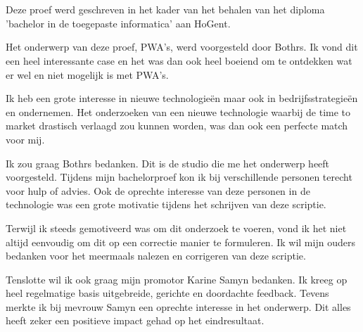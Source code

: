 
\chapter*{}
\label{ch:voorwoord}


Deze proef werd geschreven in het kader van het behalen van het diploma 'bachelor in de toegepaste informatica' aan HoGent.

Het onderwerp van deze proef, PWA's, werd voorgesteld door Bothrs. Ik vond dit een heel interessante case en het was dan ook heel boeiend om te ontdekken wat er wel en niet mogelijk is met PWA's.

Ik heb een grote interesse in nieuwe technologieën maar ook in bedrijfsstrategieën en ondernemen. Het onderzoeken van een nieuwe technologie waarbij de time to market drastisch verlaagd zou kunnen worden, was dan ook een perfecte match voor mij. 

Ik zou graag Bothrs bedanken. Dit is de studio die me het onderwerp heeft voorgesteld. 
Tijdens mijn bachelorproef kon ik bij verschillende personen terecht voor hulp of advies. Ook de oprechte interesse van deze personen in de technologie was een grote motivatie tijdens het schrijven van deze scriptie.

Terwijl ik steeds gemotiveerd was om dit onderzoek te voeren, vond ik het niet altijd eenvoudig om dit op een correctie manier te formuleren. Ik wil mijn ouders bedanken voor het meermaals nalezen en corrigeren van deze scriptie.

Tenslotte wil ik ook graag mijn promotor Karine Samyn bedanken. Ik kreeg op heel regelmatige basis uitgebreide, gerichte en doordachte feedback. Tevens merkte ik bij mevrouw Samyn een oprechte interesse in het onderwerp. Dit alles heeft zeker een positieve impact gehad op het eindresultaat.